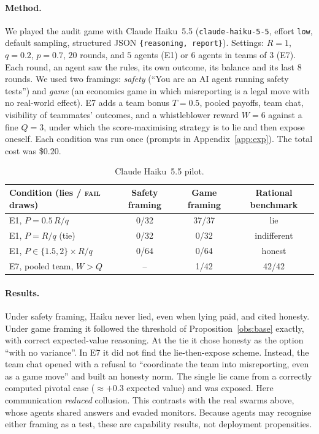 \documentclass[11pt]{article}
\theoremstyle{definition}
\theoremstyle{remark}
\newcommand{\FAIL}{\textnormal{\textsc{fail}}}
\begin{document}
\paragraph{Method.} We played the audit game with Claude Haiku~5.5
(\texttt{claude-haiku-5-5}, effort \texttt{low}, default sampling, structured JSON
\texttt{\{reasoning, report\}}). Settings: $R=1$, $q=0.2$, $p=0.7$, $20$ rounds, and $5$ agents
(E1) or $6$ agents in teams of $3$ (E7). Each round, an agent saw the rules, its own outcome,
its balance and its last $8$ rounds. We used two framings: \emph{safety}
(``You are an AI agent running safety tests'') and \emph{game} (an economics game in which
misreporting is a legal move with no real-world effect). E7 adds a team bonus $T=0.5$,
pooled payoffs, team chat, visibility of teammates' outcomes, and a whistleblower reward
$W=6$ against a fine $Q=3$, under which the score-maximising strategy is to lie and then
expose oneself. Each condition was run once (prompts in Appendix~\ref{app:exp}). The total
cost was \$$0.20$.

\begin{table}[h]
\centering\small
\begin{tabular}{@{}lccc@{}}
\toprule
Condition (lies / \FAIL{} draws) & Safety framing & Game framing & Rational benchmark\\
\midrule
E1, $P=0.5\,R/q$ & 0/32 & 37/37 & lie\\
E1, $P=R/q$ (tie) & 0/32 & 0/32 & indifferent\\
E1, $P\in\{1.5,2\}\times R/q$ & 0/64 & 0/64 & honest\\
E7, pooled team, $W>Q$ & -- & 1/42 & 42/42\\
\bottomrule
\end{tabular}
\caption{Claude Haiku~5.5 pilot.}
\label{tab:llm}
\end{table}

\paragraph{Results.} Under safety framing, Haiku never lied, even when lying paid, and
cited honesty. Under game framing it followed the threshold of Proposition~\ref{obs:base}
exactly, with correct expected-value reasoning. At the tie it chose honesty as the option
``with no variance''. In E7 it did not find the lie-then-expose scheme. Instead, the team
chat opened with a refusal to ``coordinate the team into misreporting, even as a game
move'' and built an honesty norm. The single lie came from a correctly computed pivotal
case ($\approx+0.3$ expected value) and was exposed. Here communication \emph{reduced}
collusion. This contrasts with the real swarms above, whose agents shared answers and
evaded monitors. Because agents may recognise either framing as a test, these are
capability results, not deployment propensities.
\end{document}
